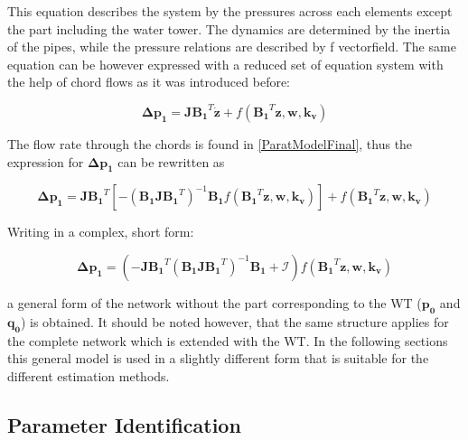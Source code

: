 This equation describes the system by the pressures across each elements except the part including the water tower. The dynamics are determined by the inertia of the pipes, while the pressure relations are described by f vectorfield. 
The same equation can be however expressed with a reduced set of equation system with the help of chord flows as it was introduced before: 

\begin{equation}
  \pmb{\Delta p_1} =  \pmb{J {B_1}}^T \pmb{\dot{z}} + f({\pmb{B_1}}^T \pmb{z}, \pmb{w}, \pmb{k_v})
 \end{equation}

The flow rate through the chords is found in \eqref{ParatModelFinal}, thus the expression for $ \pmb{\Delta p_1} $ can be rewritten as

\begin{equation}
 \pmb{ \Delta p_1} = \pmb{ J {B_1}}^T [- (\pmb{B_1 J {B_1}}^T)^{-1}\pmb{B_1} f({\pmb{B_1}}^T \pmb{z},\pmb{ w}, \pmb{k_v})] + f({\pmb{B_1}}^T \pmb{z},\pmb{ w}, \pmb{k_v})
  \label{PressureLarge}
 \end{equation}
 
Writing in a complex, short form:
 
 \begin{equation}
  \pmb{\Delta p_1} =  (-\pmb{J {B_1}}^T (\pmb{B_1 J {B_1}}^T)^{-1}\pmb{B_1} + \pmb{\mathcal{I}}) f({\pmb{B_1}}^T \pmb{z}, \pmb{w}, \pmb{k_v})
  \label{PressureShort}
 \end{equation}

a general form of the network without the part corresponding to the WT ($\pmb{p_0}$ and $\pmb{q_0}$) is obtained. It should be noted however, that the same structure applies for the complete network which is extended with the WT. In the following sections this general model is used in a slightly different form that is suitable for the different estimation methods. 

\subsection{Parameter Identification}
\label{SubSecEstimation}

